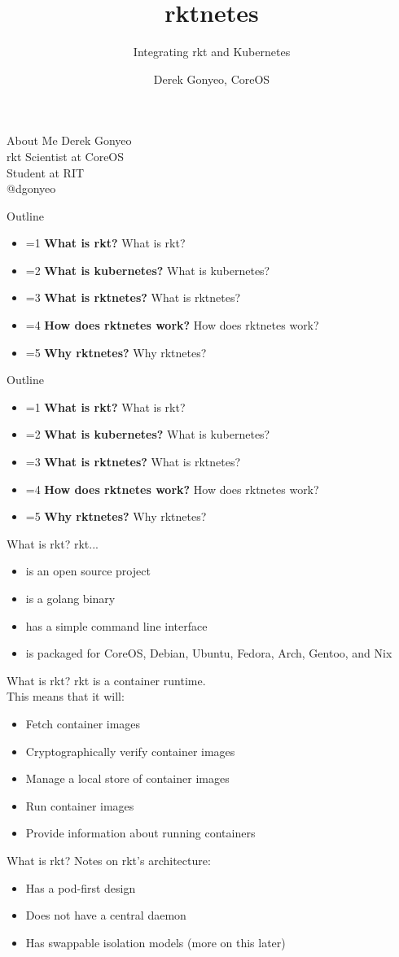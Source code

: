 \documentclass[pdf,aspectratio=169,14pt]{beamer}
\title{rktnetes}
\subtitle{Integrating rkt and Kubernetes}
\author{Derek Gonyeo, CoreOS}
\newcommand{\mbold}[3]{
    \ifnum #1=#2
        \textbf{#3}
    \else
        #3
    \fi
}
\newcommand{\outline}[1]{
    \begin{frame}
        Outline
        \begin{itemize}
            \item \mbold{#1}{1}{What is rkt?}
            \item \mbold{#1}{2}{What is kubernetes?}
            \item \mbold{#1}{3}{What is rktnetes?}
            \item \mbold{#1}{4}{How does rktnetes work?}
            \item \mbold{#1}{5}{Why rktnetes?}
        \end{itemize}
    \end{frame}
}
\begin{document}
\begin{frame}
    \titlepage
\end{frame}

\begin{frame}{About Me}
    Derek Gonyeo \\
    rkt Scientist at CoreOS \\
    Student at RIT \\
    @dgonyeo
\end{frame}

\outline{0}


\outline{1}

\begin{frame}{What is rkt?}
    rkt...
    \begin{itemize}
        \item<2-> is an open source project
        \item<3-> is a golang binary
        \item<4-> has a simple command line interface
        \item<5-> is packaged for CoreOS, Debian, Ubuntu, Fedora, Arch, Gentoo, and Nix
    \end{itemize}
\end{frame}

\begin{frame}{What is rkt?}
    rkt is a container runtime. \\
    \vspace{1em}
    This means that it will:
    \begin{itemize}
        \item<2-> Fetch container images
        \item<3-> Cryptographically verify container images
        \item<4-> Manage a local store of container images
        \item<5-> Run container images
        \item<6-> Provide information about running containers
    \end{itemize}
\end{frame}

\begin{frame}{What is rkt?}
    Notes on rkt's architecture:
    \begin{itemize}
        \item<2-> Has a pod-first design
        \item<3-> Does not have a central daemon
        \item<4-> Has swappable isolation models (more on this later)
    \end{itemize}
\end{frame}
\end{document}
